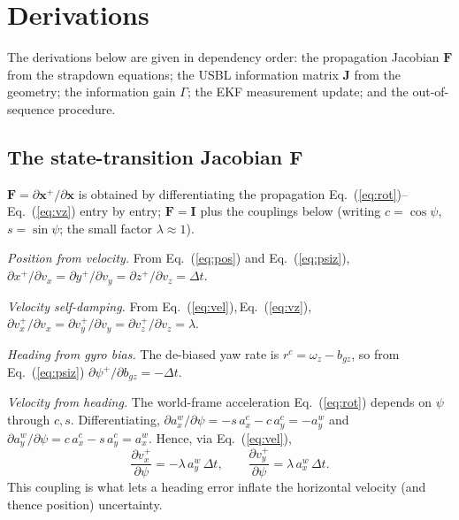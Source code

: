 \documentclass[12pt,a4paper,oneside]{book}
\newcommand{\eqnref}[1]{Eq.~(\ref{#1})}
\begin{document}
\chapter{Derivations}
\label{app:deriv}
The derivations below are given in dependency order: the propagation Jacobian $\mathbf{F}$ from the
strapdown equations; the USBL information matrix $\mathbf{J}$ from the geometry; the information gain
$\Gamma$; the EKF measurement update; and the out-of-sequence procedure.

\section{The state-transition Jacobian $\mathbf{F}$}
\label{app:F}
$\mathbf{F}=\partial\mathbf{x}^{+}/\partial\mathbf{x}$ is obtained by differentiating the propagation
\eqnref{eq:rot}--\eqnref{eq:vz} entry by entry; $\mathbf{F}=\mathbf{I}$ plus the couplings below (writing
$c=\cos\psi$, $s=\sin\psi$; the small factor $\lambda\approx1$).

\emph{Position from velocity.} From \eqnref{eq:pos} and \eqnref{eq:psiz},
$\partial x^{+}/\partial v_x=\partial y^{+}/\partial v_y=\partial z^{+}/\partial v_z=\Delta t$.

\emph{Velocity self-damping.} From \eqnref{eq:vel},\,\eqnref{eq:vz},
$\partial v_x^{+}/\partial v_x=\partial v_y^{+}/\partial v_y=\partial v_z^{+}/\partial v_z=\lambda$.

\emph{Heading from gyro bias.} The de-biased yaw rate is $r^c=\omega_z-b_{gz}$, so from \eqnref{eq:psiz}
$\partial \psi^{+}/\partial b_{gz}=-\Delta t$.

\emph{Velocity from heading.} The world-frame acceleration \eqnref{eq:rot} depends on $\psi$ through $c,s$.
Differentiating, $\partial a_x^w/\partial\psi=-s\,a_x^c-c\,a_y^c=-a_y^w$ and
$\partial a_y^w/\partial\psi=c\,a_x^c-s\,a_y^c=a_x^w$. Hence, via \eqnref{eq:vel},
\begin{equation}
\frac{\partial v_x^{+}}{\partial \psi}=-\lambda\,a_y^w\,\Delta t,\qquad
\frac{\partial v_y^{+}}{\partial \psi}= \lambda\,a_x^w\,\Delta t .
\end{equation}
This coupling is what lets a heading error inflate the horizontal velocity (and thence position) uncertainty.
\end{document}
